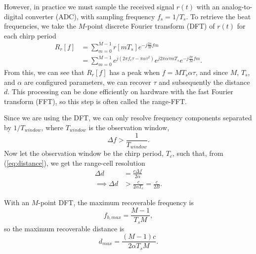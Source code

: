 However, in practice we must sample the received signal $r(t)$ with an
analog-to-digital converter (ADC), with sampling frequency $f_s = 1/T_s$. To retrieve
the beat frequencies, we take the $M$-point discrete Fourier transform (DFT)
\cite{vetterli2014foundations} of $r(t)$ for each chirp period
\begin{align}
	R_r[f] &= \sum_{m=0}^{M-1} r[mT_s] e^{-j\frac{2\pi}{M}fm} \label{eq:range-fft}\\
	&= \sum_{m=0}^{M-1} e^{j(2\pi f_c\tau -
	\pi\alpha\tau^2)}e^{j2\pi\alpha\tau mT_s} e^{-j\frac{2\pi}{M}fm}.
\end{align}
From this, we can see that $R_r[f]$ has a peak when $f=MT_s\alpha\tau$, and since
$M$, $T_s$, and $\alpha$ are configured parameters, we can recover $\tau$ and
subsequently the distance $d$.
This processing can be done efficiently on hardware with the fast Fourier transform (FFT),
so this step is often called the range-FFT. 

Since we are using the DFT, we can only resolve frequency components
separated by $1/T_{window}$, where $T_{window}$ is the observation window,
\begin{equation}
	\Delta f > \frac{1}{T_{window}}.	
\end{equation}
Now let the observation window be the chirp period, $T_c$, such
that, from (\ref{eq:distance}), we get the range-cell resolution
\begin{align}
	\Delta d &= \frac{c\Delta f}{2\alpha}\\
	\implies \Delta d &> \frac{c}{2\alpha T_c} = \frac{c}{2B}. \label{eq:range-res}
\end{align}

With an $M$-point DFT, the maximum recoverable frequency is 
\begin{equation}
	f_{b,max} = \frac{M-1}{T_sM},
\end{equation}
so the maximum recoverable distance is
\begin{equation}
	d_{max} = \frac{(M-1)c}{2\alpha T_sM}.
\end{equation}

